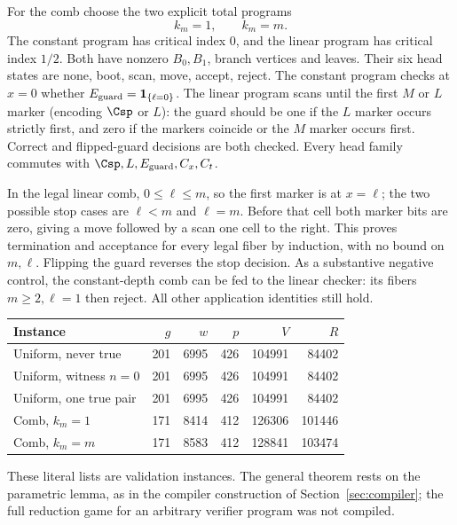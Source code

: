 For the comb choose the two explicit total programs
\begin{equation}
                       k_m=1,\qquad k_m=m.                  \label{eq:validation-V3}
\end{equation}
The constant program has critical index $0$, and the linear program
has critical index $1/2$. Both have nonzero $B_0,B_1$, branch vertices
and leaves. Their six head states are none, boot, scan, move, accept,
reject. The constant program checks at $x=0$ whether
${E_{\rm guard}}=\mathbf1_{\{\ell=0\}}$. The linear program scans until the first
$M$ or $L$ marker (encoding $\Csp$ or $L$): the guard should be one if the $L$ marker occurs
strictly first, and zero if the markers coincide or the $M$ marker
occurs first. Correct and flipped-guard decisions are both checked.
Every head family commutes with $\Csp,L,{E_{\rm guard}},C_x,C_t$.

In the legal linear comb, $0\le\ell\le m$, so the first marker is
at $x=\ell$; the two possible stop cases are $\ell<m$ and $\ell=m$.
Before that cell both marker bits are zero, giving a move followed by
a scan one cell to the right. This proves termination and acceptance
for every legal fiber by induction, with no bound on $m,\ell$.
Flipping the guard reverses the stop decision. As a substantive
negative control, the constant-depth comb can be fed to the linear
checker: its fibers $m\ge2,\ell=1$ then reject. All other application
identities still hold.

\begin{center}\small
\begin{tabular}{@{}lrrrrr@{}}
\toprule Instance & $g$ & $w$ & $p$ & $V$ & $R$\\\midrule
Uniform, never true & 201 & 6995 & 426 & 104991 & 84402\\
Uniform, witness $n=0$ & 201 & 6995 & 426 & 104991 & 84402\\
Uniform, one true pair & 201 & 6995 & 426 & 104991 & 84402\\
Comb, $k_m=1$ & 171 & 8414 & 412 & 126306 & 101446\\
Comb, $k_m=m$ & 171 & 8583 & 412 & 128841 & 103474\\\bottomrule
\end{tabular}
\end{center}
These literal lists are validation instances. The general theorem
rests on the parametric lemma, as in the compiler construction of Section~\ref{sec:compiler}; the
full reduction game for an arbitrary verifier program was not compiled.

